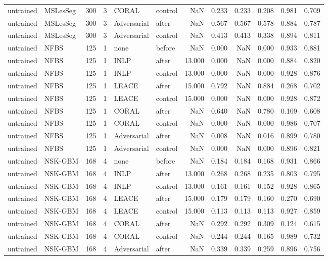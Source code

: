 \begin{tabular}{llrrllrrrrrr}
untrained & MSLesSeg & 300 & 3 & CORAL & control & NaN & 0.233 & 0.233 & 0.208 & 0.981 & 0.709 \\
untrained & MSLesSeg & 300 & 3 & Adversarial & after & NaN & 0.567 & 0.567 & 0.578 & 0.884 & 0.787 \\
untrained & MSLesSeg & 300 & 3 & Adversarial & control & NaN & 0.413 & 0.413 & 0.338 & 0.894 & 0.811 \\
untrained & NFBS & 125 & 1 & none & before & NaN & 0.000 & NaN & 0.000 & 0.933 & 0.881 \\
untrained & NFBS & 125 & 1 & INLP & after & 13.000 & 0.000 & NaN & 0.000 & 0.884 & 0.820 \\
untrained & NFBS & 125 & 1 & INLP & control & 13.000 & 0.000 & NaN & 0.000 & 0.928 & 0.876 \\
untrained & NFBS & 125 & 1 & LEACE & after & 15.000 & 0.792 & NaN & 0.884 & 0.268 & 0.702 \\
untrained & NFBS & 125 & 1 & LEACE & control & 15.000 & 0.000 & NaN & 0.000 & 0.928 & 0.872 \\
untrained & NFBS & 125 & 1 & CORAL & after & NaN & 0.640 & NaN & 0.780 & 0.109 & 0.608 \\
untrained & NFBS & 125 & 1 & CORAL & control & NaN & 0.000 & NaN & 0.000 & 0.986 & 0.707 \\
untrained & NFBS & 125 & 1 & Adversarial & after & NaN & 0.008 & NaN & 0.016 & 0.899 & 0.780 \\
untrained & NFBS & 125 & 1 & Adversarial & control & NaN & 0.000 & NaN & 0.000 & 0.896 & 0.821 \\
untrained & NSK-GBM & 168 & 4 & none & before & NaN & 0.184 & 0.184 & 0.168 & 0.931 & 0.866 \\
untrained & NSK-GBM & 168 & 4 & INLP & after & 13.000 & 0.268 & 0.268 & 0.235 & 0.803 & 0.795 \\
untrained & NSK-GBM & 168 & 4 & INLP & control & 13.000 & 0.161 & 0.161 & 0.152 & 0.928 & 0.865 \\
untrained & NSK-GBM & 168 & 4 & LEACE & after & 15.000 & 0.179 & 0.179 & 0.160 & 0.270 & 0.690 \\
untrained & NSK-GBM & 168 & 4 & LEACE & control & 15.000 & 0.113 & 0.113 & 0.113 & 0.927 & 0.859 \\
untrained & NSK-GBM & 168 & 4 & CORAL & after & NaN & 0.292 & 0.292 & 0.309 & 0.124 & 0.615 \\
untrained & NSK-GBM & 168 & 4 & CORAL & control & NaN & 0.244 & 0.244 & 0.165 & 0.989 & 0.732 \\
untrained & NSK-GBM & 168 & 4 & Adversarial & after & NaN & 0.339 & 0.339 & 0.259 & 0.896 & 0.756 \\

\end{tabular}
